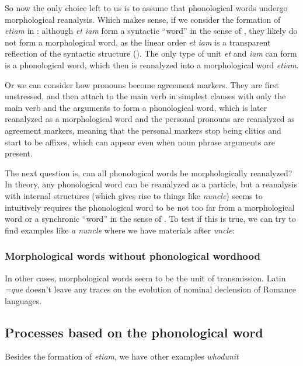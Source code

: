 \documentclass[a4paper, oneside, scheme=plain, 12pt]{article}
\newcommand{\form}[1]{\emph{#1}}
\begin{document}
So now the only choice left to us is to assume that phonological words undergo morphological reanalysis.
Which makes sense, if we consider the formation of \form{etiam} in :
although \form{et iam} form a syntactic ``word'' in the sense of ,
they likely do not form a morphological word,
as the linear order \form{et iam} is a transparent reflection of the syntactic structure
().
The only type of unit \form{et} and \form{iam} can form is a phonological word,
which then is reanalyzed into a morphological word \form{etiam}.

Or we can consider how pronouns become agreement markers.
They are first unstressed, and then attach to the main verb in simplest clauses with only the main verb and the arguments to form a phonological word,
which is later reanalyzed as a morphological word and the personal pronouns are reanalyzed as agreement markers, meaning that the personal markers stop being clitics and start to be affixes,
which can appear even when noun phrase arguments are present.

The next question is, can all phonological words be morphologically reanalyzed?
In theory, any phonological word can be reanalyzed as a particle,
but a reanalysis with internal structures (which gives rise to things like \form{nuncle})
seems to intuitively requires the phonological word to be not too far from a morphological word
or a synchronic ``word'' in the sense of .
To test if this is true, we can try to find examples like \form{a nuncle} where we have materials after \form{uncle}:

\subsubsection{Morphological words without phonological wordhood}

In other cases, morphological words seem to be the unit of transmission.
Latin \form{=que} doesn't leave any traces on the evolution of nominal declension of Romance languages.


\subsection{Processes based on the phonological word}\label{sec:phonological-word-multiple-morphological-word-evolution}

Besides the formation of \form{etiam},
we have other examples \form{whodunit} 
\end{document}
